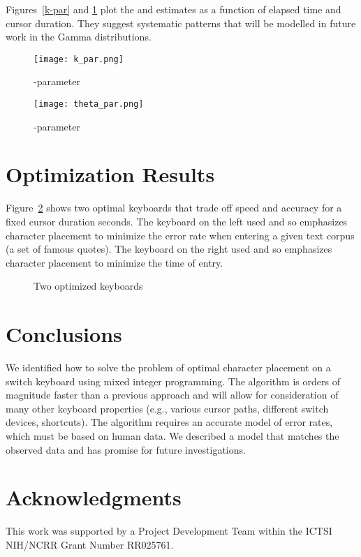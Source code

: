 \documentclass{sig-alternate}
\begin{document}
Figures~\ref{k-par} and \ref{theta-par} plot the  and  estimates as a function of elapsed time and cursor duration. They suggest systematic patterns that will be modelled in future work in the Gamma distributions. 

\begin{figure}[htb!]
\begin{minipage}[t]{0.5\linewidth}
\texttt{[image: k\_par.png]}
\caption{-parameter}
\label{k-par}
\end{minipage}\begin{minipage}[t]{0.5\linewidth}
\texttt{[image: theta\_par.png]}
\caption{-parameter}
\label{theta-par}
\end{minipage}
\end{figure}

\section{Optimization Results}
Figure~\ref{optr} shows two optimal keyboards that trade off speed and accuracy for a fixed cursor duration  seconds. The keyboard on the left used  and so emphasizes character placement to minimize the error rate when entering a given text corpus (a set of famous quotes). The keyboard on the right used  and so emphasizes character placement to minimize the time of entry.
\begin{figure}[htb!]
  \centering
  \hspace{0.05cm}
    \caption{Two optimized keyboards}
	\label{optr}	
\end{figure}

\section{Conclusions}
We identified how to solve the problem of optimal character placement on a switch keyboard using mixed integer programming. The algorithm is orders of magnitude faster than a previous approach and will allow for consideration of many other keyboard properties (e.g., various cursor paths, different switch devices, shortcuts). The algorithm requires an accurate model of error rates, which must be based on human data. We described a model that matches the observed data and has promise for future investigations. 


\section{Acknowledgments}
This work was supported by a Project Development Team within the ICTSI NIH/NCRR Grant Number RR025761.




\end{document}
